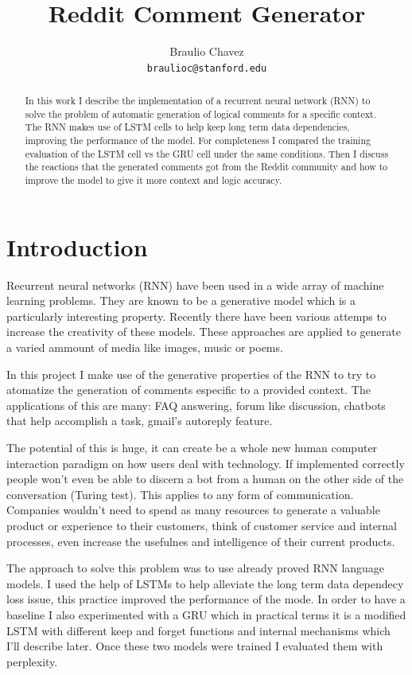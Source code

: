 \documentclass{article} %
\begin{document}
\title{Reddit Comment Generator}
\author{Braulio Chavez \\
  \texttt{braulioc@stanford.edu}}
\maketitle

\begin{abstract}
In this work I describe the implementation of a recurrent neural network (RNN)
to solve the problem of automatic generation of logical comments for a specific
context. The RNN makes use of LSTM cells to help keep long term data
dependencies, improving the performance of the model. For completeness I
compared the training evaluation of the LSTM cell vs the GRU cell under the
same conditions. Then I discuss the reactions that the generated comments got
from the Reddit community and how to improve the model to give it more context
and logic accuracy.
\end{abstract}

\section{Introduction}
Recurrent neural networks (RNN) have been used in a wide array of machine
learning problems. They are known to be a generative model which is a
particularly interesting property. Recently there have been various attemps to
increase the creativity of these models. These approaches are applied to
generate a varied ammount of media like images, music or poems.

In this project I make use of the generative properties of the RNN to try to
atomatize the generation of comments especific to a provided context. The
applications of this are many: FAQ answering, forum like discussion, chatbots
that help accomplish a task, gmail's autoreply feature.

The potential of this is huge, it can create be a whole new human computer
interaction paradigm on how users deal with technology. If implemented correctly
people won't even be able to discern a bot from a human on the other side of the
conversation (Turing test). This applies to any form of communication. Companies
wouldn't need to spend as many resources to generate a valuable product or
experience to their customers, think of customer service and internal processes,
even increase the usefulnes and intelligence of their current products.

The approach to solve this problem was to use already proved RNN language
models. I used the help of LSTMs to help alleviate the long term data dependecy
loss issue, this practice improved the performance of the mode. In order to have
a baseline I also experimented with a GRU which in practical terms it is a
modified LSTM with different keep and forget functions and internal mechanisms
which I'll describe later. Once these two models were trained I evaluated them
with perplexity.
\end{document}
